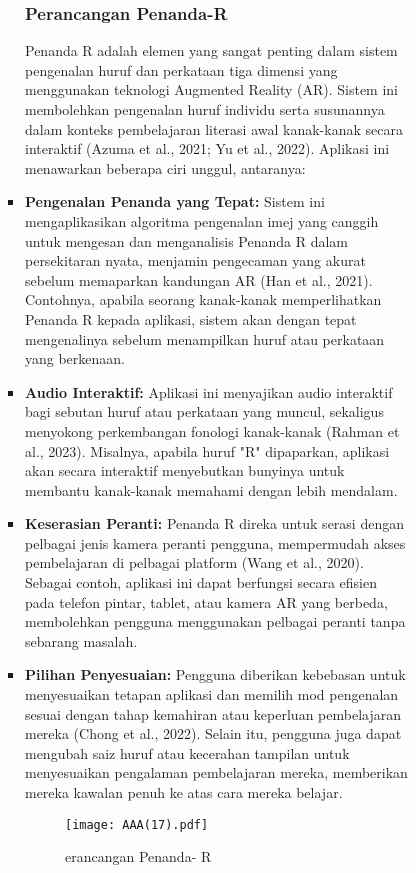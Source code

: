 \begin{itemize}
\begin{itemize}
\begin{itemize}
\begin{itemize}
\begin{itemize}
\subsubsection{Perancangan Penanda-R}
Penanda R adalah elemen yang sangat penting dalam sistem pengenalan huruf dan perkataan tiga dimensi yang menggunakan teknologi Augmented Reality (AR). Sistem ini membolehkan pengenalan huruf individu serta susunannya dalam konteks pembelajaran literasi awal kanak-kanak secara interaktif (Azuma et al., 2021; Yu et al., 2022). Aplikasi ini menawarkan beberapa ciri unggul, antaranya:  \\

\item \textbf{Pengenalan Penanda yang Tepat:} Sistem ini mengaplikasikan algoritma pengenalan imej yang canggih untuk mengesan dan menganalisis Penanda R dalam persekitaran nyata, menjamin pengecaman yang akurat sebelum memaparkan kandungan AR (Han et al., 2021). Contohnya, apabila seorang kanak-kanak memperlihatkan Penanda R kepada aplikasi, sistem akan dengan tepat mengenalinya sebelum menampilkan huruf atau perkataan yang berkenaan.  \\
\item \textbf{Audio Interaktif:} Aplikasi ini menyajikan audio interaktif bagi sebutan huruf atau perkataan yang muncul, sekaligus menyokong perkembangan fonologi kanak-kanak (Rahman et al., 2023). Misalnya, apabila huruf "R" dipaparkan, aplikasi akan secara interaktif menyebutkan bunyinya untuk membantu kanak-kanak memahami dengan lebih mendalam.  \\
\item \textbf{Keserasian Peranti:} Penanda R direka untuk serasi dengan pelbagai jenis kamera peranti pengguna, mempermudah akses pembelajaran di pelbagai platform (Wang et al., 2020). Sebagai contoh, aplikasi ini dapat berfungsi secara efisien pada telefon pintar, tablet, atau kamera AR yang berbeda, membolehkan pengguna menggunakan pelbagai peranti tanpa sebarang masalah.  \\
\item \textbf{Pilihan Penyesuaian:} Pengguna diberikan kebebasan untuk menyesuaikan tetapan aplikasi dan memilih mod pengenalan sesuai dengan tahap kemahiran atau keperluan pembelajaran mereka (Chong et al., 2022). Selain itu, pengguna juga dapat mengubah saiz huruf atau kecerahan tampilan untuk menyesuaikan pengalaman pembelajaran mereka, memberikan mereka kawalan penuh ke atas cara mereka belajar.  
\clearpage

\begin{figure}[h]
    \centering
    \texttt{[image: AAA(17).pdf]}
    \caption{erancangan Penanda-        R}
    \label{fig:enter-label}
\end{figure}
\clearpage


\end{itemize}
\end{itemize}
\end{itemize}
\end{itemize}
\end{itemize}
